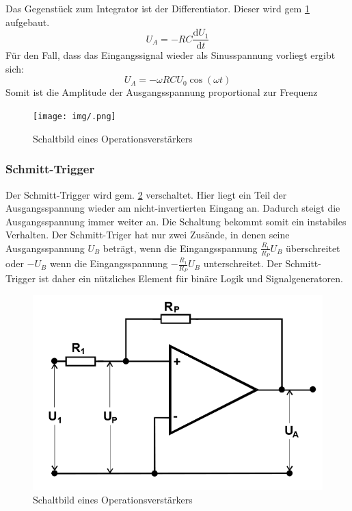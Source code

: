 Das Gegenstück zum Integrator ist der Differentiator. Dieser wird gem \ref{abb:diff} aufgebaut.
\begin{equation}
U_A = -RC \frac{\text{d} U_1}{\text{d} t}
\end{equation}
Für den Fall, dass das Eingangssignal wieder als Sinusspannung vorliegt ergibt sich:
\begin{equation}
U_A = -\omega RCU_0 \cos(\omega t)
\end{equation}
Somit ist die Amplitude der Ausgangsspannung proportional zur Frequenz

\begin{figure}
 	\centering
 	\texttt{[image: img/.png]}
 	\caption{Schaltbild eines Operationsverstärkers}
 	\label{abb:diff}
\end{figure}


\subsubsection{Schmitt-Trigger}
Der Schmitt-Trigger wird gem. \ref{abb:sch} verschaltet. Hier liegt ein Teil der Ausgangsspannung wieder am  nicht-invertierten Eingang an. Dadurch steigt die Ausgangsspannung immer weiter an. Die Schaltung bekommt somit ein instabiles Verhalten. Der Schmitt-Triger hat nur zwei Zusände, in denen seine Ausgangsspannung $U_B$ beträgt, wenn die Eingangsspannung $\frac{R_1}{R_P} U_B$ überschreitet oder
$-U_B$ wenn die Eingangsspannung $-\frac{R_1}{R_P} U_B$ unterschreitet. Der Schmitt-Trigger ist daher ein nützliches Element für binäre Logik und Signalgeneratoren.

\begin{figure}
 	\centering
 	\includegraphics[width=\textwidth]{img/schmitt.png}
 	\caption{Schaltbild eines Operationsverstärkers}
 	\label{abb:sch}
\end{figure}

